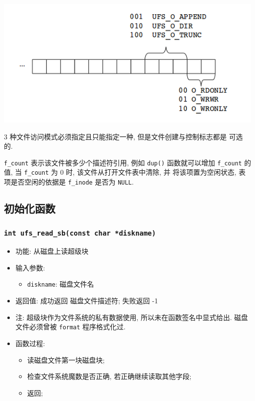 \documentclass[nofonts, titlepage]{ctexart}
\begin{document}
\begin{center}
\includegraphics[width=14cm]{./images/./file_mode.png}
\label{fig:f_mode}
\end{center}

3 种文件访问模式必须指定且只能指定一种, 但是文件创建与控制标志都是
可选的.

\texttt{f\_count} 表示该文件被多少个描述符引用, 例如 \texttt{dup()}
函数就可以增加 \texttt{f\_count} 的值, 当 \texttt{f\_count} 为 0 时,
该文件从打开文件表中清除, 并 将该项置为空闲状态, 表项是否空闲的依据是
\texttt{f\_inode} 是否为 \verb'NULL'.

\subsection{初始化函数}
\subsubsection[\texttt{ufs\_read\_sb}]{\texttt{int ufs\_read\_sb(const char *diskname)}}
\begin{itemize}
\item
  功能: 从磁盘上读超级块
\item
  输入参数:

  \begin{itemize}
  \item
    \texttt{diskname}: 磁盘文件名
  \end{itemize}
\item
  返回值: 成功返回 磁盘文件描述符; 失败返回 -1
\item
  注: 超级块作为文件系统的私有数据使用, 所以未在函数签名中显式给出.
  磁盘文件必须曾被 \texttt{format} 程序格式化过.
\item
  函数过程:

  \begin{itemize}
  \item
    读磁盘文件第一块磁盘块;
  \item
    检查文件系统魔数是否正确, 若正确继续读取其他字段;
  \item
    返回;
  \end{itemize}
\end{itemize}
\end{document}
